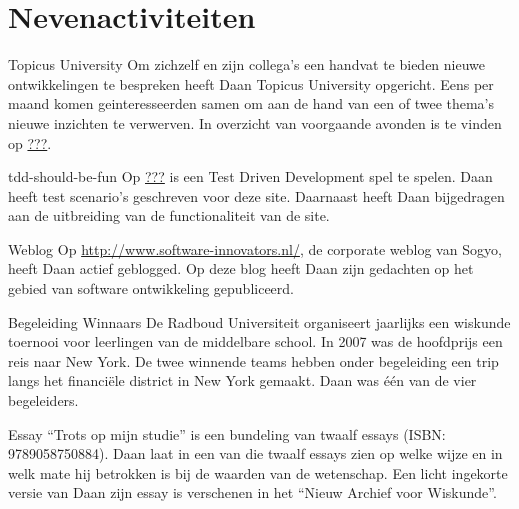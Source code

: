 \section*{Nevenactiviteiten}

	\begin{subActivityList}
		\item[Topicus University] Om zichzelf en zijn collega's een handvat te
		bieden nieuwe ontwikkelingen te bespreken heeft Daan Topicus University
		opgericht. Eens per maand komen geinteresseerden samen om aan de hand
		van een of twee thema's nieuwe inzichten te verwerven. In overzicht
		van voorgaande avonden is te vinden op \url{???}.
	
		\item[tdd-should-be-fun] Op \url{???} is een Test Driven Development spel
		te spelen. Daan heeft test scenario's geschreven voor deze site. 
		Daarnaast heeft Daan bijgedragen aan de uitbreiding van de 
		functionaliteit van de site.\hfill\\
	
		\item[Weblog] Op \url{http://www.software-innovators.nl/}, de corporate
		weblog van Sogyo, heeft Daan actief geblogged. Op deze blog heeft
		Daan zijn gedachten op het gebied van software ontwikkeling gepubliceerd.
		\hfill\\
		
		\item[Begeleiding Winnaars] De Radboud Universiteit organiseert 
		jaarlijks een wiskunde toernooi voor leerlingen van de middelbare 
		school. In 2007 was de hoofdprijs een reis naar New York. De twee 
		winnende teams hebben onder begeleiding een trip langs het financi\"ele 
		district in New York gemaakt. Daan was \'e\'en van de vier begeleiders.
		\hfill\\
		
		\item[Essay] ``Trots op mijn studie'' is een bundeling van twaalf essays 
		(ISBN: 9789058750884). Daan laat in een van die twaalf essays zien op 
		welke wijze en in welk mate hij betrokken is bij de waarden van de 
		wetenschap.
		Een licht ingekorte versie van Daan zijn essay is verschenen in het 
		``Nieuw Archief voor Wiskunde''.		
		\hfill\\
	\end{subActivityList}

